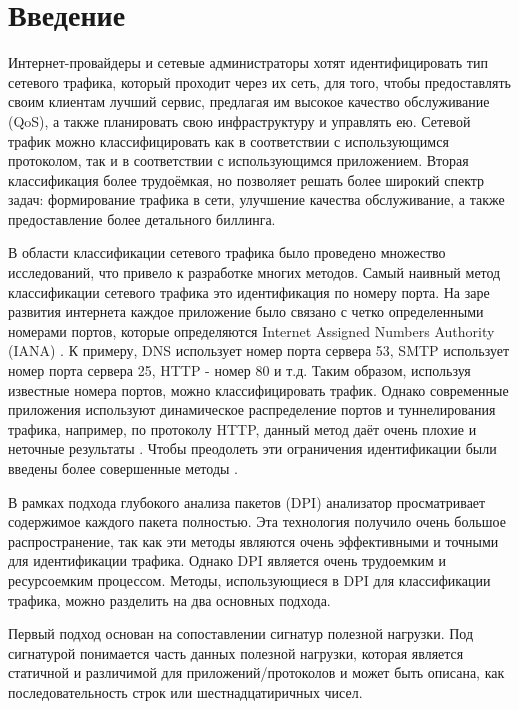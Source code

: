 \section{Введение}
\label{sec:Chapter0} 

Интернет-провайдеры и сетевые администраторы хотят идентифицировать тип сетевого трафика, который проходит через их сеть, для того,
чтобы предоставлять своим клиентам лучший сервис, предлагая им высокое качество обслуживание (QoS),
а также планировать свою инфраструктуру и управлять ею. Сетевой трафик можно классифицировать как в соответствии с использующимся протоколом,
так и в соответствии с использующимся приложением. Вторая классификация более трудоёмкая, но позволяет решать более широкий спектр задач:
формирование трафика в сети, улучшение качества обслуживание, а также предоставление более детального биллинга.

В области классификации сетевого трафика было проведено множество исследований, что привело к разработке многих методов.
Самый наивный метод классификации сетевого трафика это идентификация по номеру порта.
На заре развития интернета каждое приложение было связано с четко определенными номерами портов,
которые определяются Internet Assigned Numbers Authority (IANA) \cite{IANA}.
К примеру, DNS использует номер порта сервера 53,
SMTP использует номер порта сервера 25, HTTP - номер 80 и т.д.
Таким образом, используя известные номера портов, можно классифицировать трафик.
Однако современные приложения используют динамическое распределение портов и туннелирования трафика, например, по протоколу HTTP,
данный метод даёт очень плохие и неточные результаты \cite{dusi2009tunnel}.
Чтобы преодолеть эти ограничения идентификации были введены более совершенные методы \cite{getman2015analys}.

В рамках подхода глубокого анализа пакетов (DPI) анализатор просматривает содержимое каждого пакета полностью.
Эта технология получило очень большое распространение,
так как эти методы являются очень эффективными и точными для идентификации трафика.
Однако DPI является очень трудоемким и ресурсоемким процессом.
Методы, использующиеся в DPI для классификации трафика, можно разделить на два основных подхода.

Первый подход основан на сопоставлении сигнатур полезной нагрузки. Под сигнатурой понимается часть данных полезной нагрузки,
которая является статичной и различимой для приложений/протоколов и может быть описана, как последовательность строк или шестнадцатиричных чисел.

